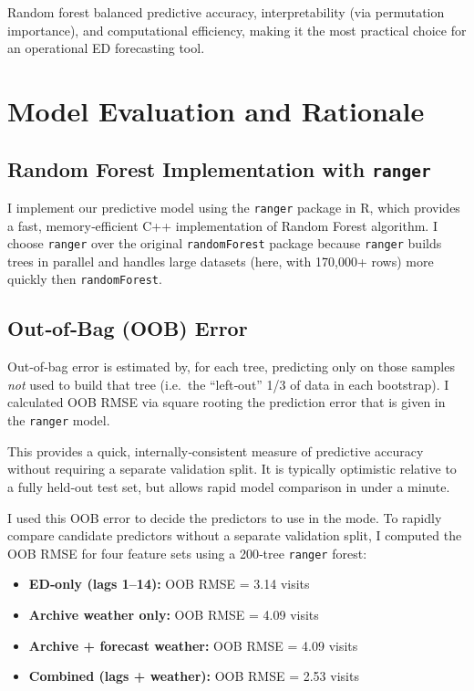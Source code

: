 \documentclass[11pt]{article}
\begin{document}
Random forest balanced predictive accuracy, interpretability (via permutation importance), and computational efficiency, making it the most practical choice for an operational ED forecasting tool.

\section{Model Evaluation and Rationale}

\subsection{Random Forest Implementation with \texttt{ranger}}

I implement our predictive model using the \texttt{ranger} package in R, which provides a fast, memory‐efficient C++ implementation of Random Forest algorithm.  I choose \texttt{ranger} over the original \texttt{randomForest} package because \texttt{ranger} builds trees in parallel and handles large datasets (here, with 170,000+ rows) more quickly then \texttt{randomForest}.

\subsection{Out‐of‐Bag (OOB) Error}

Out‐of‐bag error is estimated by, for each tree, predicting only on those samples \emph{not} used to build that tree (i.e.\ the “left‐out” 1/3 of data in each bootstrap).  I calculated OOB RMSE via square rooting the prediction error that is given in the \texttt{ranger} model.

This provides a quick, internally‐consistent measure of predictive accuracy without requiring a separate validation split.  It is typically optimistic relative to a fully held‐out test set, but allows rapid model comparison in under a minute.

I used this OOB error to decide the predictors to use in the mode. To rapidly compare candidate predictors without a separate validation split, I computed the OOB RMSE for four feature sets using a 200‐tree \texttt{ranger} forest:

\begin{itemize}[nosep]
  \item \textbf{ED‐only (lags 1–14):} OOB RMSE = 3.14 visits
  \item \textbf{Archive weather only:} OOB RMSE = 4.09 visits
  \item \textbf{Archive + forecast weather:} OOB RMSE = 4.09 visits
  \item \textbf{Combined (lags + weather):} OOB RMSE = 2.53 visits
\end{itemize}
\end{document}
